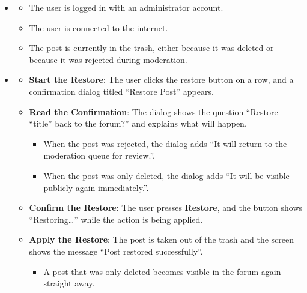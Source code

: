 \begin{itemize}[leftmargin=1.6em,topsep=4pt,itemsep=3pt,parsep=0pt,label=$\bullet$]
    \item {}
        \begin{itemize}[leftmargin=2.2em,topsep=2pt,itemsep=3pt,parsep=0pt,label=$\circ$]
            \item The user is logged in with an administrator account.
            \item The user is connected to the internet.
            \item The post is currently in the trash, either because it was deleted or because it was rejected during moderation.
        \end{itemize}
    \item {}
        \begin{itemize}[leftmargin=2.2em,topsep=2pt,itemsep=3pt,parsep=0pt,label=$\circ$]
            \item \textbf{Start the Restore}: The user clicks the restore button on a row, and a confirmation dialog titled ``Restore Post'' appears.
            \item \textbf{Read the Confirmation}: The dialog shows the question ``Restore ``title'' back to the forum?'' and explains what will happen.
                \begin{itemize}[leftmargin=2.2em,topsep=2pt,itemsep=3pt,parsep=0pt,label=$\blacksquare$]
                    \item When the post was rejected, the dialog adds ``It will return to the moderation queue for review.''.
                    \item When the post was only deleted, the dialog adds ``It will be visible publicly again immediately.''.
                \end{itemize}
            \item \textbf{Confirm the Restore}: The user presses \textbf{Restore}, and the button shows ``Restoring\dots'' while the action is being applied.
            \item \textbf{Apply the Restore}: The post is taken out of the trash and the screen shows the message ``Post restored successfully''.
                \begin{itemize}[leftmargin=2.2em,topsep=2pt,itemsep=3pt,parsep=0pt,label=$\blacksquare$]
                    \item A post that was only deleted becomes visible in the forum again straight away.

\end{itemize}
\end{itemize}
\end{itemize}
